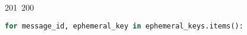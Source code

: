 201~200~\documentclass{article}
\begin{document}
\begin{lstlisting}[language=Python, caption=Unlock messages]
	                                                                                                                                                                                                                                                                                                	                                                                                                                                        	    	                                                                                                	                                                                                                                                                                        for message_id, ephemeral_key in ephemeral_keys.items():
	                                                                                                                                                                                                                                                                                                	                                                                                                                                        	    	                                                                                                	                                                                                                                                                                                if ephemeral_key:
	                                                                                                                                                                                                                                                                                                	                                                                                                                                        	    	                                                                                                	                                                                                                                                                                                            local_message = db_local_message.get_message_by_id(message_id)
	                                                                                                                                                                                                                                                                                                	                                                                                                                                        	    	                                                                                                	                                                                                                                                                                                                        local_message.senderEphemeralPublicKey = ephemeral_key

\end{lstlisting}
\end{document}
